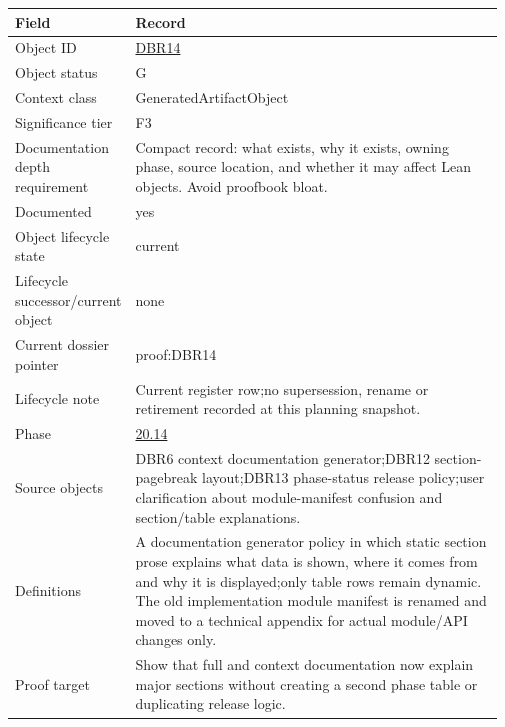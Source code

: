 \begin{longtable}{L{0.16\linewidth} L{0.81\linewidth}}
\hline
\textbf{Field} & \textbf{Record}\\
\hline
Object ID & \hyperlink{object-row-DBR14}{DBR14}\\
\hline\addlinespace[0.20em]
Object status & G\\
\hline\addlinespace[0.20em]
Context class & GeneratedArtifactObject\\
\hline\addlinespace[0.20em]
Significance tier & F3\\
\hline\addlinespace[0.20em]
Documentation depth requirement & Compact record: what exists, why it exists, owning phase, source location, and whether it may affect Lean objects. Avoid proofbook bloat.\\
\hline\addlinespace[0.20em]
Documented & yes\\
\hline\addlinespace[0.20em]
Object lifecycle state & current\\
\hline\addlinespace[0.20em]
Lifecycle successor/\allowbreak{}current object & none\\
\hline\addlinespace[0.20em]
Current dossier pointer & proof:DBR14\\
\hline\addlinespace[0.20em]
Lifecycle note & Current register row;\newline no supersession, rename or retirement recorded at this planning snapshot.\\
\hline\addlinespace[0.20em]
Phase & \hyperlink{phase-row-20-14}{20.14}\\
\hline\addlinespace[0.20em]
Source objects & DBR6 context documentation generator;\newline DBR12 section-pagebreak layout;\newline DBR13 phase-status release policy;\newline user clarification about module-manifest confusion and section/\allowbreak{}table explanations.\\
\hline\addlinespace[0.20em]
Definitions & A documentation generator policy in which static section prose explains what data is shown, where it comes from and why it is displayed;\newline only table rows remain dynamic. The old implementation module manifest is renamed and moved to a technical appendix for actual module/\allowbreak{}API changes only.\\
\hline\addlinespace[0.20em]
Proof target & Show that full and context documentation now explain major sections without creating a second phase table or duplicating release logic.\\

\end{longtable}

